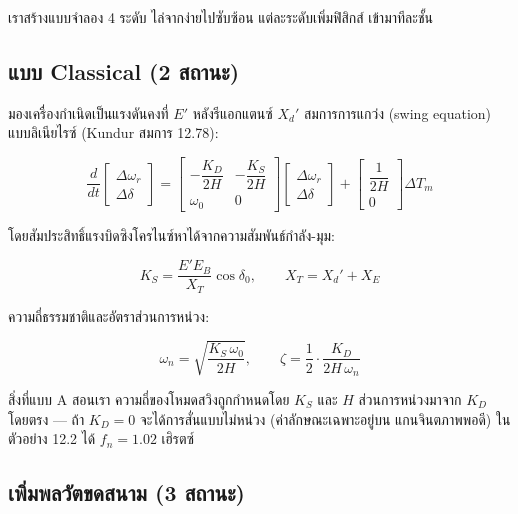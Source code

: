 \documentclass[12pt,a4paper]{article}
\newcommand{\dwr}{\Delta\omega_r}
\newcommand{\ddel}{\Delta\delta}
\begin{document}
เราสร้างแบบจำลอง 4 ระดับ ไล่จากง่ายไปซับซ้อน แต่ละระดับเพิ่มฟิสิกส์
เข้ามาทีละชั้น

\subsection{แบบ Classical (2 สถานะ)}

มองเครื่องกำเนิดเป็นแรงดันคงที่ $E'$ หลังรีแอกแตนซ์ $X_d'$ สมการการแกว่ง
(swing equation) แบบลิเนียไรซ์ (Kundur สมการ 12.78):

\begin{equation}
\frac{d}{dt}
\begin{bmatrix} \dwr \\ \ddel \end{bmatrix}
=
\begin{bmatrix}
-\dfrac{K_D}{2H} & -\dfrac{K_S}{2H} \\[2ex]
\omega_0 & 0
\end{bmatrix}
\begin{bmatrix} \dwr \\ \ddel \end{bmatrix}
+
\begin{bmatrix} \dfrac{1}{2H} \\[2ex] 0 \end{bmatrix}
\Delta T_m
\end{equation}

โดยสัมประสิทธิ์แรงบิดซิงโครไนซ์หาได้จากความสัมพันธ์กำลัง-มุม:

\begin{equation}
K_S = \frac{E' E_B}{X_T}\cos\delta_0,
\qquad X_T = X_d' + X_E
\end{equation}

ความถี่ธรรมชาติและอัตราส่วนการหน่วง:

\begin{equation}
\omega_n = \sqrt{\frac{K_S\,\omega_0}{2H}},
\qquad
\zeta = \frac{1}{2}\cdot\frac{K_D}{2H\,\omega_n}
\end{equation}

\begin{keybox}{สิ่งที่แบบ A สอนเรา}
ความถี่ของโหมดสวิงถูกกำหนดโดย $K_S$ และ $H$ ส่วนการหน่วงมาจาก $K_D$
โดยตรง --- ถ้า $K_D = 0$ จะได้การสั่นแบบไม่หน่วง (ค่าลักษณะเฉพาะอยู่บน
แกนจินตภาพพอดี) ในตัวอย่าง 12.2 ได้ $f_n = 1.02$ เฮิรตซ์
\end{keybox}

\subsection{เพิ่มพลวัตขดสนาม (3 สถานะ)}
\end{document}
